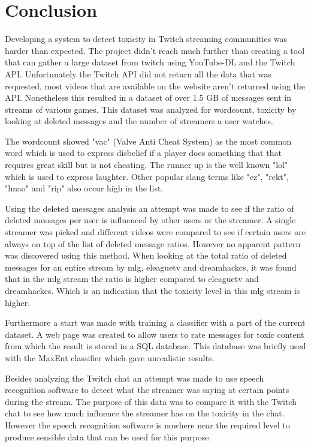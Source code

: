 \documentclass[final]{report}
\begin{document}
\chapter{Conclusion}
\label{ch:conclusion}

Developing a system to detect toxicity in Twitch streaming communities was harder than expected. The project didn't reach much further than creating a tool that can gather a large dataset from twitch using YouTube-DL and the Twitch API. Unfortunately the Twitch API did not return all the data that was requested, most videos that are available on the website aren't returned using the API. Nonetheless this resulted in a dataset of over 1.5 GB of messages sent in streams of various games. This dataset was analyzed for wordcount, toxicity by looking at deleted messages and the number of streamers a user watches.

The wordcount showed "vac" (Valve Anti Cheat System) as the most common word which is used to express disbelief if a player does something that that requires great skill but is not cheating. The runner up is the well known "lol" which is used to express laughter. Other popular slang terms like "ez", "rekt", "lmao" and "rip" also occur high in the list.

Using the deleted messages analysis an attempt was made to see if the ratio of deleted messages per user is influenced by other users or the streamer. A single streamer was picked and different videos were compared to see if certain users are always on top of the list of deleted message ratios. However no apparent pattern was discovered using this method. When looking at the total ratio of deleted messages for an entire stream by mlg, eleaguetv and dreamhackcs, it was found that in the mlg stream the ratio is higher compared to eleaguetv and dreamhackcs. Which is an indication that the toxicity level in this mlg stream is higher.

Furthermore a start was made with training a classifier with a part of the current dataset. A web page was created to allow users to rate messages for toxic content from which the result is stored in a SQL database. This database was briefly used with the MaxEnt classifier which gave unrealistic results.

Besides analyzing the Twitch chat an attempt was made to use speech recognition software to detect what the streamer was saying at certain points during the stream. The purpose of this data was to compare it with the Twitch chat to see how much influence the streamer has on the toxicity in the chat. However the speech recognition software is nowhere near the required level to produce sensible data that can be used for this purpose. 
\end{document}
